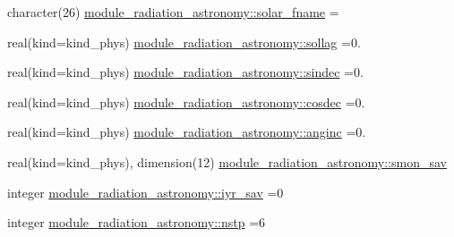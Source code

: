 \begin{DoxyCompactItemize}
\item 
character(26) \hyperlink{namespacemodule__radiation__astronomy_a05ee7e378d38b90242738b9bf6c40c00}{module\+\_\+radiation\+\_\+astronomy\+::solar\+\_\+fname} = \textquotesingle{} \textquotesingle{}
\item 
real(kind=kind\+\_\+phys) \hyperlink{namespacemodule__radiation__astronomy_a264a011aa71fb670339ac555dc24e486}{module\+\_\+radiation\+\_\+astronomy\+::sollag} =0.
\item 
real(kind=kind\+\_\+phys) \hyperlink{namespacemodule__radiation__astronomy_ae195d9c834e2789170f89c988d28b01e}{module\+\_\+radiation\+\_\+astronomy\+::sindec} =0.
\item 
real(kind=kind\+\_\+phys) \hyperlink{namespacemodule__radiation__astronomy_a07386e90045639b8023abd826e0e2768}{module\+\_\+radiation\+\_\+astronomy\+::cosdec} =0.
\item 
real(kind=kind\+\_\+phys) \hyperlink{namespacemodule__radiation__astronomy_a723159a44491e4ae974128123a1e8dcd}{module\+\_\+radiation\+\_\+astronomy\+::anginc} =0.
\item 
real(kind=kind\+\_\+phys), dimension(12) \hyperlink{namespacemodule__radiation__astronomy_ab68b4488022a4c6340cb60dca3feff6a}{module\+\_\+radiation\+\_\+astronomy\+::smon\+\_\+sav}
\item 
integer \hyperlink{namespacemodule__radiation__astronomy_a83370fbee96388e545a89eb25ed6df90}{module\+\_\+radiation\+\_\+astronomy\+::iyr\+\_\+sav} =0
\item 
integer \hyperlink{namespacemodule__radiation__astronomy_ab93fe36440da3cc1f1d64cae2ec4c25b}{module\+\_\+radiation\+\_\+astronomy\+::nstp} =6
\end{DoxyCompactItemize}
